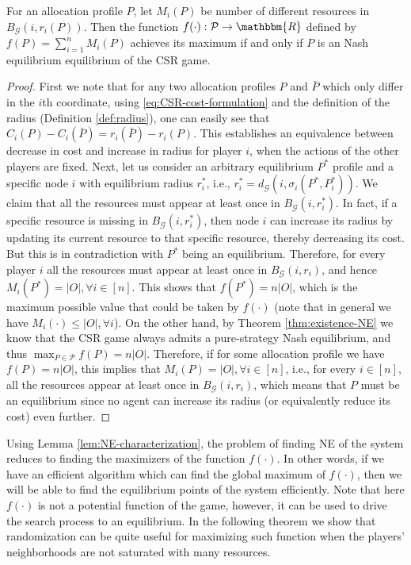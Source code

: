 \begin{lemma}\label{lem:NE-characterization}
For an allocation profile $P$, let $M_i(P)$ be number of different resources in $B_{\mathcal{G}}(i,r_i(P))$. Then the function $f(\cdot):\mathcal{P}\rightarrow \mathbbm{R}$ defined by $f(P)=\sum_{i=1}^{n}M_i(P)$ achieves its maximum if and only if $P$ is an Nash equilibrium equilibrium of the CSR game. 
\end{lemma} 
\begin{proof}
First we note that for any two allocation profiles $P$ and $\bar{P}$ which only differ in the $i$th coordinate, using \eqref{eq:CSR-cost-formulation} and the definition of the radius (Definition \ref{def:radius}), one can easily see that $C_i(P)-C_i(\bar{P})=r_i(\bar{P})-r_i(P)$. This establishes an equivalence between decrease in cost and increase in radius for player $i$, when the actions of the other players are fixed. Next, let us consider an arbitrary equilibrium $P^*$ profile and a specific node $i$ with equilibrium radius $r^*_i$, i.e., $r^*_i=d_{\mathcal{G}}(i,\sigma_i(P^*,P^*_i))$. We claim that all the resources must appear at least once in $B_{\mathcal{G}}(i,r^*_i)$. In fact, if a specific resource is missing in $B_{\mathcal{G}}(i,r^*_i)$, then node $i$ can increase its radius by updating its current resource to that specific resource, thereby decreasing its cost. But this is in contradiction with $P^*$ being an equilibrium. Therefore, for every player $i$ all the resources must appear at least once in $B_{\mathcal{G}}(i,r_i)$, and hence $M_i(P^*)=|O|, \forall i\in [n]$. This shows that $f(P^*)=n|O|$, which is the maximum possible value that could be taken by $f(\cdot)$ (note that in general we have  $M_i(\cdot)\leq |O|, \forall i$). On the other hand, by Theorem \ref{thm:existence-NE} we know that the CSR game always admits a pure-strategy Nash equilibrium, and thus $\max_{P\in \mathcal{P}}f(P)=n|O|$. Therefore, if for some allocation profile we have $f(P)=n|O|$, this implies that $M_i(P)=|O|, \forall i\in [n]$, i.e., for every $i\in [n]$, all the resources appear at least once in $B_{\mathcal{G}}(i,r_i)$, which means that $P$ must be an equilibrium since no agent can increase its radius (or equivalently reduce its cost) even further.  
\end{proof}

\smallskip
Using Lemma \ref{lem:NE-characterization}, the problem of finding NE of the system reduces to finding the maximizers of the function $f(\cdot)$. In other words, if we have an efficient algorithm which can find the global maximum of $f(\cdot)$, then we will be able to find the equilibrium points of the system efficiently. Note that here $f(\cdot)$ is not a potential function of the game, however, it can be used to drive the search process to an equilibrium. In the following theorem we show that randomization can be quite useful for maximizing such function when the players' neighborhoods are not saturated with many resources. 

